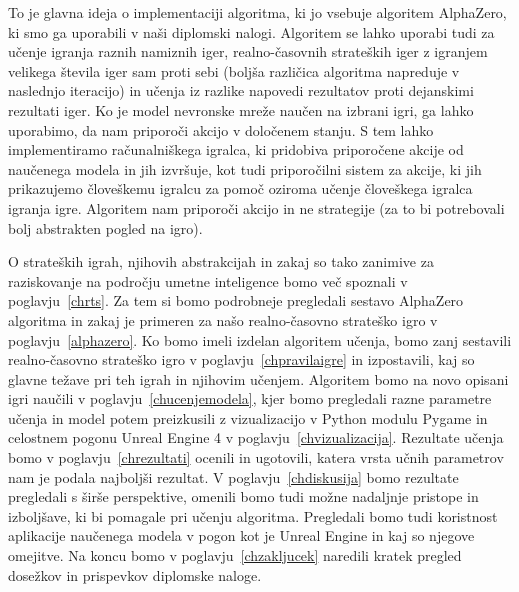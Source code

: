 \documentclass[a4paper, 12pt]{book}
\begin{document}
To je glavna ideja o implementaciji algoritma, ki jo vsebuje algoritem AlphaZero, ki smo ga uporabili v naši diplomski nalogi.
Algoritem se lahko uporabi tudi za učenje igranja raznih namiznih iger, realno-časovnih strateških iger z igranjem velikega števila iger sam proti sebi (boljša različica algoritma napreduje v naslednjo iteracijo) in učenja iz razlike napovedi rezultatov proti dejanskimi rezultati iger.
Ko je model nevronske mreže naučen na izbrani igri, ga lahko uporabimo, da nam priporoči akcijo v določenem stanju.
S tem lahko implementiramo računalniškega igralca, ki pridobiva priporočene akcije od naučenega modela in jih izvršuje, kot tudi priporočilni sistem za akcije, ki jih prikazujemo človeškemu igralcu za pomoč oziroma učenje človeškega igralca igranja igre. 
Algoritem nam priporoči akcijo in ne strategije (za to bi potrebovali bolj abstrakten pogled na igro). 

O strateških igrah, njihovih abstrakcijah in zakaj so tako zanimive za raziskovanje na področju umetne inteligence bomo več spoznali v poglavju~\ref{chrts}.
Za tem si bomo podrobneje pregledali sestavo AlphaZero algoritma in zakaj je primeren za našo realno-časovno strateško igro v poglavju~\ref{alphazero}.
Ko bomo imeli izdelan algoritem učenja, bomo zanj sestavili realno-časovno strateško igro v poglavju~\ref{chpravilaigre} in izpostavili, kaj so glavne težave pri teh igrah in njihovim učenjem.
Algoritem bomo na novo opisani igri naučili v poglavju~\ref{chucenjemodela}, kjer bomo pregledali razne parametre učenja in model potem preizkusili z vizualizacijo v Python modulu Pygame in celostnem pogonu Unreal Engine 4 v poglavju~\ref{chvizualizacija}.
Rezultate učenja bomo v poglavju~\ref{chrezultati} ocenili in ugotovili, katera vrsta učnih parametrov nam je podala najboljši rezultat.
V poglavju~\ref{chdiskusija} bomo rezultate pregledali s širše perspektive, omenili bomo tudi možne nadaljnje pristope in izboljšave, ki bi pomagale pri učenju algoritma. 
Pregledali bomo tudi koristnost aplikacije naučenega modela v pogon kot je Unreal Engine in kaj so njegove omejitve.
Na koncu bomo v poglavju~\ref{chzakljucek} naredili kratek pregled dosežkov in prispevkov diplomske naloge.

\end{document}
